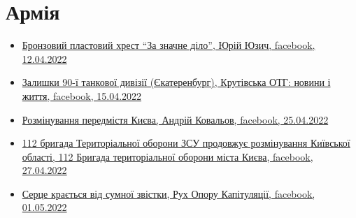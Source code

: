  
 
 
 
 
\section{Армія}



\begin{itemize} %

\item \hyperlink{12_04_2022.fb.juzych_jurij.1.plast_krest_nagrada}{%
Бронзовий пластовий хрест \enquote{За значне діло}, Юрій Юзич, facebook, 12.04.2022%
}

\item \hyperlink{15_04_2022.fb.krutivska_otg.1.zalyshky_divizii_ekaterinburg}{%
Залишки 90-ї танкової дивізії (Єкатеренбург), Крутівська ОТГ: новини і життя, %
facebook, 15.04.2022%
}

\item \hyperlink{25_04_2022.fb.kovalov_andrij.1.razminirovanie_predmestij_kieva}{%
Розмінування передмістя Києва, Андрій Ковальов, facebook, 25.04.2022%
}

\item \hyperlink{27_04_2022.fb.teroborona_ua.kiev.112.br.1.rozminuvannja_kiev_obl}{%
112 бригада Територіальної оборони ЗСУ продовжує розмінування Київської області, %
112 Бригада територіальної оборони міста Києва, facebook, 27.04.2022%
}

\item \hyperlink{01_05_2022.fb.fb_group.ruh_oporu_kapituljacii.1.smert_ruslan_borovik}{%
Серце крається від сумної звістки, Рух Опору Капітуляції, facebook, 01.05.2022%
}
\end{itemize} %
